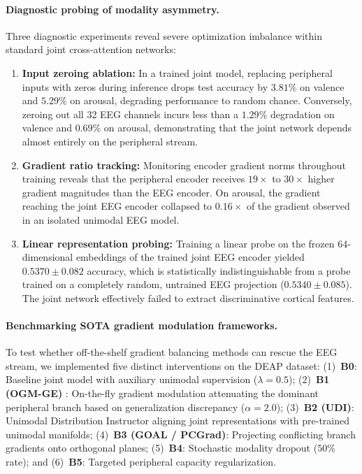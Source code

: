 \documentclass[a4paper,fleqn]{cas-sc}
\begin{document}
\paragraph{Diagnostic probing of modality asymmetry.}
Three diagnostic experiments reveal severe optimization imbalance within standard joint cross-attention networks:
\begin{enumerate}
    \item \textbf{Input zeroing ablation:} In a trained joint model, replacing peripheral inputs with zeros during inference drops test accuracy by $3.81\%$ on valence and $5.29\%$ on arousal, degrading performance to random chance. Conversely, zeroing out all 32 EEG channels incurs less than a $1.29\%$ degradation on valence and $0.69\%$ on arousal, demonstrating that the joint network depends almost entirely on the peripheral stream.
    \item \textbf{Gradient ratio tracking:} Monitoring encoder gradient norms throughout training reveals that the peripheral encoder receives $19\times$ to $30\times$ higher gradient magnitudes than the EEG encoder. On arousal, the gradient reaching the joint EEG encoder collapsed to $0.16\times$ of the gradient observed in an isolated unimodal EEG model.
    \item \textbf{Linear representation probing:} Training a linear probe on the frozen 64-dimensional embeddings of the trained joint EEG encoder yielded $0.5370\pm0.082$ accuracy, which is statistically indistinguishable from a probe trained on a completely random, untrained EEG projection ($0.5340\pm0.085$). The joint network effectively failed to extract discriminative cortical features.
\end{enumerate}

\paragraph{Benchmarking SOTA gradient modulation frameworks.}
To test whether off-the-shelf gradient balancing methods can rescue the EEG stream, we implemented five distinct interventions on the DEAP dataset: (1)~\textbf{B0}: Baseline joint model with auxiliary unimodal supervision ($\lambda=0.5$); (2)~\textbf{B1 (OGM-GE)} \citep{peng2022balanced}: On-the-fly gradient modulation attenuating the dominant peripheral branch based on generalization discrepancy ($\alpha=2.0$); (3)~\textbf{B2 (UDI)}: Unimodal Distribution Instructor aligning joint representations with pre-trained unimodal manifolds; (4)~\textbf{B3 (GOAL / PCGrad)}: Projecting conflicting branch gradients onto orthogonal planes; (5)~\textbf{B4}: Stochastic modality dropout ($50\%$ rate); and (6)~\textbf{B5}: Targeted peripheral capacity regularization.
\end{document}
